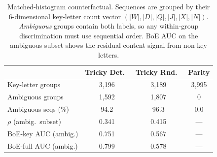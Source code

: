 \begin{table}[t]
\centering
\small
\caption{Matched-histogram counterfactual. Sequences are grouped by their 6-dimensional key-letter count vector $(|W|,|D|,|Q|,|J|,|X|,|N|)$. \emph{Ambiguous} groups contain both labels, so any within-group discrimination must use sequential order. BoE AUC on the ambiguous subset shows the residual content signal from non-key letters.}
\label{tab:matched_histogram}
\begin{tabular}{l c c c}
\toprule
 & Tricky Det.\ & Tricky Rnd.\ & Parity \\
\midrule
Key-letter groups & 3,196 & 3,189 & 3,995 \\
Ambiguous groups & 1,592 & 1,807 & 0 \\
Ambiguous seqs (\%) & 94.2 & 96.3 & 0.0 \\
$\rho$ (ambig.\ subset) & 0.341 & 0.415 & --- \\
BoE-key AUC (ambig.) & 0.751 & 0.567 & --- \\
BoE-full AUC (ambig.) & 0.799 & 0.578 & --- \\
\bottomrule
\end{tabular}
\end{table}